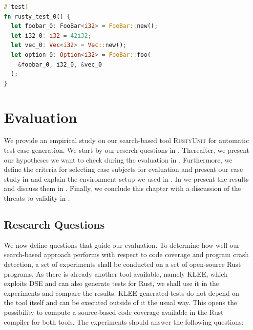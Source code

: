 \documentclass[paper=a4,%
  twoside,%
  BCOR4mm,%
  abstract=true,%
  toc=bibliography,%
  chapterprefix=true,%
  toc=bibliographynumbered,%
  open=right,%
  english,%
  pagesize=pdftex]{scrreprt}
\begin{document}
\begin{lstlisting}[language=Rust, style=boxed, caption={An example test that invokes \lstinline{FooBar::foo}}, label=lst:example-generated-test]
#[test]
fn rusty_test_0() {
  let foobar_0: FooBar<i32> = FooBar::new();
  let i32_0: i32 = 42i32;
  let vec_0: Vec<i32> = Vec::new();
  let option_0: Option<i32> = FooBar::foo(
    &foobar_0, i32_0, &vec_0
  );
}
\end{lstlisting}

\clearpage
\chapter{Evaluation}
\label{chap:evaluation}

We provide an empirical study on our search-based tool \textsc{RustyUnit} for automatic test case generation. We start by our reserch questions in . Thereafter, we present our hypotheses we want to check during the evaluation in . Furthermore, we define the criteria for selecting case subjects for evaluation and present our case study in  and explain the environment setup we used in . In  we present the results and discuss them in . Finally, we conclude this chapter with a discussion of the threats to validity in .


\section{Research Questions}
\label{sec:research-questions}
We now define questions that guide our evaluation. To determine how well our search-based approach performs with respect to code coverage and program crash detection, a set of experiments shall be conducted on a set of open-source Rust programs. As there is already another tool available, namely \textsc{KLEE}, which exploits \ac{DSE} and can also generate tests for Rust, we shall use it in the experiments and compare the results. \textsc{KLEE}-generated tests do not depend on the tool itself and can be executed outside of it the usual way. This opens the possibility to compute a source-based code coverage available in the Rust compiler for both tools. The experiments should answer the following questions:

\end{document}
